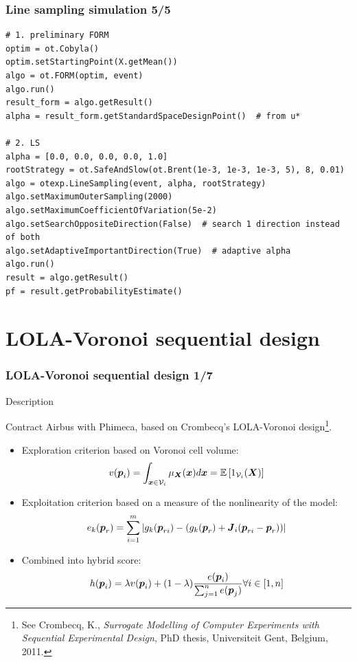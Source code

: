 \documentclass[aspectratio=169]{beamer}
\begin{document}

\begin{frame}[containsverbatim]
\frametitle{Line sampling simulation 5/5}

\begin{small}
\lstset{language=python}
\begin{lstlisting}
# 1. preliminary FORM
optim = ot.Cobyla()
optim.setStartingPoint(X.getMean())
algo = ot.FORM(optim, event)
algo.run()
result_form = algo.getResult()
alpha = result_form.getStandardSpaceDesignPoint()  # from u*

# 2. LS
alpha = [0.0, 0.0, 0.0, 0.0, 1.0]
rootStrategy = ot.SafeAndSlow(ot.Brent(1e-3, 1e-3, 1e-3, 5), 8, 0.01)
algo = otexp.LineSampling(event, alpha, rootStrategy)
algo.setMaximumOuterSampling(2000)
algo.setMaximumCoefficientOfVariation(5e-2)
algo.setSearchOppositeDirection(False)  # search 1 direction instead of both
algo.setAdaptiveImportantDirection(True)  # adaptive alpha
algo.run()
result = algo.getResult()
pf = result.getProbabilityEstimate()
\end{lstlisting}
\end{small}


\end{frame}


\section{LOLA-Voronoi sequential design}

\begin{frame}
\frametitle{LOLA-Voronoi sequential design 1/7}

\begin{block}{Description}

Contract Airbus with Phimeca, based on Crombecq's LOLA-Voronoi design\footnote{
See Crombecq, K., \textit{Surrogate Modelling of Computer Experiments with Sequential Experimental Design}, PhD thesis, Universiteit Gent, Belgium, 2011.
}.

\begin{itemize}
\item Exploration criterion based on Voronoi cell volume:
  $$v({\mathbf{\boldsymbol{{p}}}}_i) = \int_{{\mathbf{\boldsymbol{{x}}}} \in \mathcal{V}_i} \mu_{{\mathbf{\boldsymbol{{X}}}}}({\mathbf{\boldsymbol{{x}}}}) d{\mathbf{\boldsymbol{{x}}}} = {\mathbb{E}}\left[ 1_{\mathcal{V}_i}({\mathbf{\boldsymbol{{X}}}}) \right]$$
\item Exploitation criterion based on a measure of the nonlinearity of the model:
  $$e_k({\mathbf{\boldsymbol{{p}}}}_r) = \sum_{i=1}^m | g_k({\mathbf{\boldsymbol{{p}}}}_{ri}) - (g_k({\mathbf{\boldsymbol{{p}}}}_r) + {{\mathbf{\boldsymbol{{{\mathbf{\boldsymbol{{J}}}}}}}}}_i({\mathbf{\boldsymbol{{p}}}}_{ri} - {\mathbf{\boldsymbol{{p}}}}_r)) |$$
\item Combined into hybrid score:
$$h({\mathbf{\boldsymbol{{p}}}}_i) = \lambda v({\mathbf{\boldsymbol{{p}}}}_i) + (1 - \lambda) \frac{e({\mathbf{\boldsymbol{{p}}}}_i)}{\sum_{j=1}^n e({\mathbf{\boldsymbol{{p}}}}_j)} \forall i \in [1, n]$$

\end{itemize}

\end{block}

\end{frame}
\end{document}
